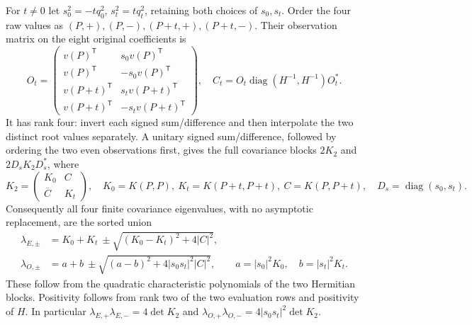 \documentclass[11pt]{article}
\newcommand{\diag}{\operatorname{diag}}
\begin{document}
For $t\ne0$ let $s_0^2=-tq_0^2$, $s_t^2=tq_t^2$, retaining both choices
of $s_0,s_t$. Order the four raw values as $(P,+),(P,-),(P+t,+),(P+t,-)$.
Their observation matrix on the eight original coefficients is
\begin{equation}
 O_t=\begin{pmatrix}
 v(P)^{\mathsf T}&s_0v(P)^{\mathsf T}\\
 v(P)^{\mathsf T}&-s_0v(P)^{\mathsf T}\\
 v(P+t)^{\mathsf T}&s_tv(P+t)^{\mathsf T}\\
 v(P+t)^{\mathsf T}&-s_tv(P+t)^{\mathsf T}
 \end{pmatrix},\quad
 C_t=O_t\diag(H^{-1},H^{-1})O_t^*.
 \tag{ECC31}
\end{equation}
It has rank four: invert each signed sum/difference and then interpolate
the two distinct root values separately. A unitary signed sum/difference,
followed by ordering the two even observations first, gives the full
covariance blocks $2K_2$ and $2D_sK_2D_s^*$, where
\begin{equation}
 K_2=\begin{pmatrix}K_0&C\\\overline C&K_t\end{pmatrix},\quad
 K_0=K(P,P),\ K_t=K(P+t,P+t),\ C=K(P,P+t),\quad
 D_s=\diag(s_0,s_t).
 \tag{ECC32}
\end{equation}
Consequently all four finite covariance eigenvalues, with no asymptotic
replacement, are the sorted union
\begin{equation}
 \begin{aligned}
 \lambda_{E,\pm}&=K_0+K_t\ \pm\sqrt{(K_0-K_t)^2+4|C|^2},\\
 \lambda_{O,\pm}&=a+b\ \pm\sqrt{(a-b)^2+4|s_0s_t|^2|C|^2},\qquad
 a=|s_0|^2K_0,\quad b=|s_t|^2K_t.
 \end{aligned}\tag{ECC33}
\end{equation}
These follow from the quadratic characteristic polynomials of the two
Hermitian blocks. Positivity follows from rank two of the two evaluation
rows and positivity of $H$. In particular
$\lambda_{E,+}\lambda_{E,-}=4\det K_2$ and
$\lambda_{O,+}\lambda_{O,-}=4|s_0s_t|^2\det K_2$.
\end{document}

